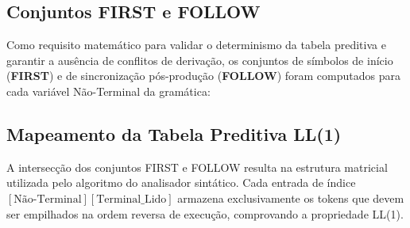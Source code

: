 \documentclass[12pt, a4paper]{article}
\begin{document}
\subsection{Conjuntos FIRST e FOLLOW}
Como requisito matemático para validar o determinismo da tabela preditiva e garantir a ausência de conflitos de derivação, os conjuntos de símbolos de início (\textbf{FIRST}) e de sincronização pós-produção (\textbf{FOLLOW}) foram computados para cada variável Não-Terminal da gramática:

\begin{table}[H]
\centering
{}
\caption{Conjuntos FIRST e FOLLOW da Gramática Homi}
\label{tab:first_follow}
\end{table}

\subsection{Mapeamento da Tabela Preditiva LL(1)}
A intersecção dos conjuntos FIRST e FOLLOW resulta na estrutura matricial utilizada pelo algoritmo do analisador sintático. Cada entrada de índice $[\text{Não-Terminal}][\text{Terminal\_Lido}]$ armazena exclusivamente os tokens que devem ser empilhados na ordem reversa de execução, comprovando a propriedade LL(1).
\end{document}
